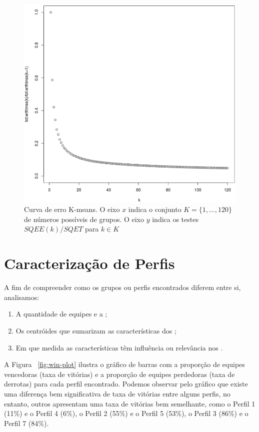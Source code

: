 \begin{figure}
  \centering
  \includegraphics[width=1\textwidth]{k-means-curve}%
  \caption{Curva de erro K-means. O eixo $x$ indica o conjunto $K=\{1, \ldots, 120\}$ de números possíveis de grupos. O eixo $y$ indica os testes $SQEE(k)/SQET$ para $k \in K $}
  \label{fig:k-means-curve}
\end{figure}

\section{Caracterização de Perfis}
A fim de compreender como os grupos ou perfis encontrados diferem entre si, analisamos:

\begin{enumerate}[label=(\roman*)]
 \item A quantidade de equipes e a ;
 \item Os centróides que sumarizam as características dos ;
 \item Em que medida as características têm influência ou relevância nos .
\end{enumerate}

A Figura ~\ref{fig:win-plot} ilustra o gr\'afico de barras com a propor\c{c}\~ao de equipes vencedoras (taxa de vit\'orias) e a propor\c{c}\~ao de equipes perdedoras (taxa de derrotas) para cada perfil encontrado. Podemos observar pelo gr\'afico que existe uma diferença bem significativa de taxa de vit\'orias entre alguns perfis, no entanto, outros apresentam uma taxa de vit\'orias bem semelhante, como o Perfil 1 (11\%) e o Perfil 4 (6\%), o Perfil 2 (55\%) e o Perfil 5 (53\%), o Perfil 3 (86\%) e o Perfil 7 (84\%).

